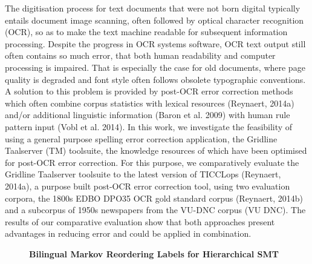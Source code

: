 \documentclass[10pt, a4paper, twopage, headinclude, footinclude, BCOR5mm]{scrartcl}
\begin{document}
\noindent
The digitisation process for text documents that were not born digital typically entails document image scanning, often followed by optical character recognition (OCR), so as to make the text machine readable for subsequent information processing. Despite the progress in OCR systems software, OCR text output still often contains so much error, that both human readability and computer processing is impaired. That is especially the case for old documents, where page quality is degraded and font style often follows obsolete typographic conventions. A solution to this problem is provided by post-OCR error correction methods which often combine corpus statistics with lexical resources (Reynaert, 2014a) and/or additional linguistic information (Baron et al. 2009) with human rule pattern input (Vobl et al. 2014). In this work, we investigate the feasibility of using a general purpose spelling error correction application, the Gridline Taalserver (TM) toolsuite, the knowledge resources of which have been optimised for post-OCR error correction. For this purpose, we comparatively evaluate the Gridline Taalserver toolsuite to the latest version of TICCLops (Reynaert, 2014a), a purpose built post-OCR error correction tool, using two evaluation corpora, the 1800s EDBO DPO35 OCR gold standard corpus (Reynaert, 2014b) and a subcorpus of 1950s newspapers from the VU-DNC corpus (VU DNC). The results of our comparative evaluation show that both approaches present advantages in reducing error and could be applied in combination.


\newpage

\begin{figure}[t!]
\centering
\large\textbf{Bilingual Markov Reordering Labels for Hierarchical SMT}
\vspace*{0.5cm}
\end{figure}


        \begin{table}[t!]
    \end{table}
\end{document}
